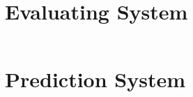 
\section{Evaluating System}
\label{Evaluating_System}
\begin{lstlisting}

\end{lstlisting}

\section{Prediction System}
\label{Prediction_System}
\begin{lstlisting}


\end{lstlisting}
